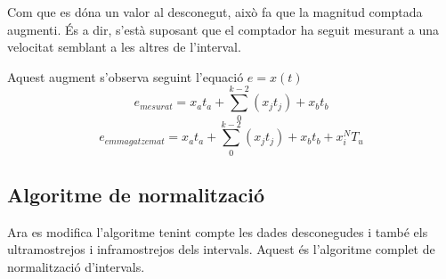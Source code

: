 Com que es dóna un valor al desconegut, això fa que la magnitud comptada augmenti. És a dir, s'està suposant que el comptador ha seguit mesurant a una velocitat semblant a les altres de l'interval.

Aquest augment s'observa seguint l'equació $e=x(t)$
$$
e_{mesurat} = x_at_a+\sum\limits_0^{k-2} (x_jt_j)+x_bt_b
$$
$$
e_{emmagatzemat} = x_at_a+\sum\limits_0^{k-2} (x_jt_j)+x_bt_b+x^N_iT_u
$$











\subsection{Algoritme de normalització}
Ara es modifica l'algoritme tenint compte les dades desconegudes i també els ultramostrejos i inframostrejos dels intervals. Aquest és l'algoritme complet de normalització d'intervals.



